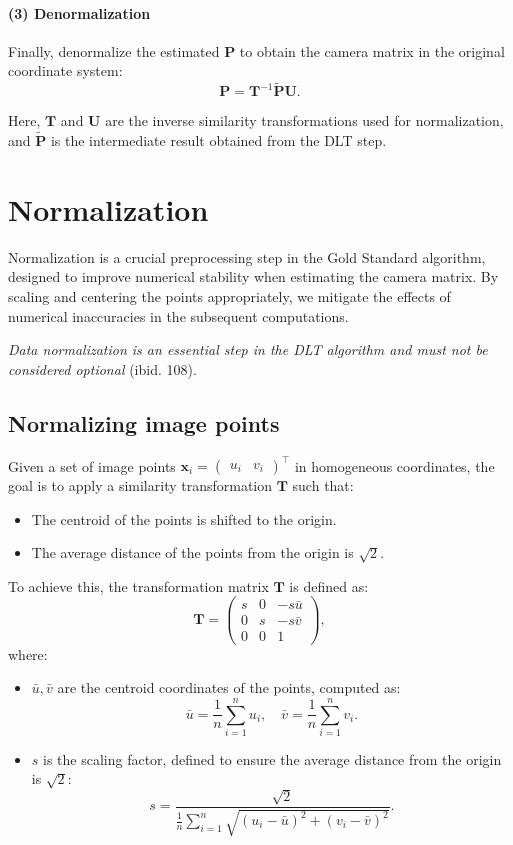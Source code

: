 \documentclass[12pt]{article}
\begin{document}
\paragraph{(3) Denormalization}
Finally, denormalize the estimated $ \mathbf{P} $ to obtain the camera matrix in the original coordinate system:
$$
\mathbf{P} = \mathbf{T}^{-1} \tilde{\mathbf{P}} \mathbf{U}.
$$

Here, $ \mathbf{T} $ and $ \mathbf{U} $ are the inverse similarity transformations used for normalization, and $ \tilde{\mathbf{P}} $ is the intermediate result obtained from the DLT step.

\section{Normalization}

Normalization is a crucial preprocessing step in the Gold Standard algorithm, designed to improve numerical stability when estimating the camera matrix. By scaling and centering the points appropriately, we mitigate the effects of numerical inaccuracies in the subsequent computations.

\textit{Data normalization is an essential step in the DLT algorithm and must not be considered optional} (ibid. 108).

\subsection{Normalizing image points}
Given a set of image points $ \mathbf{x}_i = \begin{pmatrix} u_i & v_i \end{pmatrix}^\top $ in homogeneous coordinates, the goal is to apply a similarity transformation $ \mathbf{T} $ such that:
\begin{itemize}
    \item The centroid of the points is shifted to the origin.
    \item The average distance of the points from the origin is $\sqrt{2}$.
\end{itemize}

To achieve this, the transformation matrix $ \mathbf{T} $ is defined as:
$$
\mathbf{T} = 
\begin{pmatrix} 
s & 0 & -s \bar{u} \\
0 & s & -s \bar{v} \\
0 & 0 & 1 
\end{pmatrix},
$$
where:
\begin{itemize}
    \item $ \bar{u}, \bar{v} $ are the centroid coordinates of the points, computed as:
    $$
    \bar{u} = \frac{1}{n} \sum_{i=1}^n u_i, \quad \bar{v} = \frac{1}{n} \sum_{i=1}^n v_i.
    $$
    \item $ s $ is the scaling factor, defined to ensure the average distance from the origin is $\sqrt{2}$:
    $$
    s = \frac{\sqrt{2}}{\displaystyle\frac{1}{n} \sum_{i=1}^n \sqrt{(u_i - \bar{u})^2 + (v_i - \bar{v})^2}}.
    $$
\end{itemize}
\end{document}
